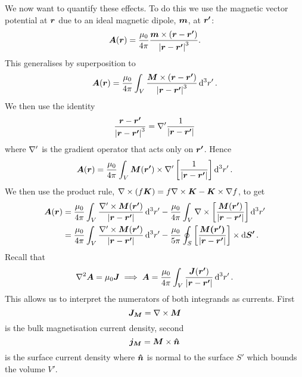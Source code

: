     We now want to quantify these effects.
    To do this we use the magnetic vector potential at \(\bm{r}\) due to an ideal magnetic dipole, \(\bm{m}\), at \(\bm{r'}\):
    \[\bm{A}(\bm{r}) = \frac{\mu_0}{4\pi} \frac{\bm{m}\times (\bm{r} - \bm{r'})}{\abs{\bm{r} - \bm{r'}}^3}.\]
    This generalises by superposition to
    \[\bm{A}(\bm{r}) = \frac{\mu_0}{4\pi} \int_V \frac{\bm{M}\times (\bm{r} - \bm{r'})}{\abs{\bm{r} - \bm{r'}}^3}\dd[3]{r'}.\]
    We then use the identity
    \[\frac{\bm{r} - \bm{r'}}{\abs{\bm{r} - \bm{r'}}^3} = \nabla' \frac{1}{\abs{\bm{r} - \bm{r'}}}\]
    where \(\nabla'\) is the gradient operator that acts only on \(\bm{r'}\).
    Hence
    \[\bm{A}(\bm{r}) = \frac{\mu_0}{4\pi} \int_V \bm{M}(\bm{r'}) \times \nabla'\left[\frac{1}{\abs{\bm{r} - \bm{r'}}}\right] \dd[3]{r'}.\]
    We then use the product rule, \(\nabla\times(f\bm{K}) = f\nabla\times\bm{K} - \bm{K}\times\nabla f\), to get
    \begin{align*}
        \bm{A}(\bm{r}) &= \frac{\mu_0}{4\pi} \int_V \frac{\nabla'\times\bm{M}(\bm{r'})}{\abs{\bm{r} - \bm{r'}}} \dd[3]{r'} - \frac{\mu_0}{4\pi} \int_V \nabla\times\left[\frac{\bm{M}(\bm{r'})}{\abs{\bm{r} - \bm{r'}}}\right] \dd[3]{r'}\\
        &= \frac{\mu_0}{4\pi} \int_V \frac{\nabla'\times\bm{M}(\bm{r'})}{\abs{\bm{r} - \bm{r'}}} \dd[3]{r'} - \frac{\mu_0}{5\pi} \oint_S \left[\frac{\bm{M(\bm{r'})}}{\abs{\bm{r} - \bm{r'}}}\right]\times \dd{\bm{S'}}.
    \end{align*}
    Recall that
    \[\nabla^2\bm{A} = \mu_0\bm{J} \implies \bm{A} = \frac{\mu_0}{4\pi} \int_V \frac{\bm{J}(\bm{r'})}{\abs{\bm{r} - \bm{r'}}}\dd[3]{r'}.\]
    This allows us to interpret the numerators of both integrands as currents.
    First
    \[\bm{J_M} = \nabla\times\bm{M}\]
    is the bulk magnetisation current density, second
    \[\bm{j_M} = \bm{M}\times\bm{\hat{n}}\]
    is the surface current density where \(\bm{\hat{n}}\) is normal to the surface \(S'\) which bounds the volume \(V'\).
    

